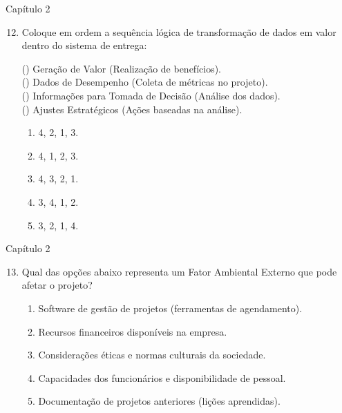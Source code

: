 \documentclass{beamer}
\begin{document}
\begin{frame}{Capítulo 2}
	\begin{enumerate}
		\setcounter{enumi}{11}
		\justifying
		\item Coloque em ordem a sequência lógica de transformação de dados em valor dentro do sistema de entrega:
		
		(\hspace{10pt}) Geração de Valor (Realização de benefícios).\\
		(\hspace{10pt}) Dados de Desempenho (Coleta de métricas no projeto).\\
		(\hspace{10pt}) Informações para Tomada de Decisão (Análise dos dados).\\
		(\hspace{10pt}) Ajustes Estratégicos (Ações baseadas na análise).
		
		\vspace{10pt}
		\begin{enumerate}[a]
			\item 4, 2, 1, 3.
			\item \alert<2>{4, 1, 2, 3}.
			\item 4, 3, 2, 1.
			\item 3, 4, 1, 2.
			\item 3, 2, 1, 4.
		\end{enumerate}
	\end{enumerate}
\end{frame}

\begin{frame}{Capítulo 2}
	\begin{enumerate}
		\setcounter{enumi}{12}
		\justifying
		\item Qual das opções abaixo representa um Fator Ambiental Externo que pode afetar o projeto?
		\begin{enumerate}[a]
			\justifying
			\item Software de gestão de projetos (ferramentas de agendamento).
			\item Recursos financeiros disponíveis na empresa.
			\item \alert<2>{Considerações éticas e normas culturais da sociedade}.
			\item Capacidades dos funcionários e disponibilidade de pessoal.
			\item Documentação de projetos anteriores (lições aprendidas).
		\end{enumerate}
	\end{enumerate}
\end{frame}
\end{document}
